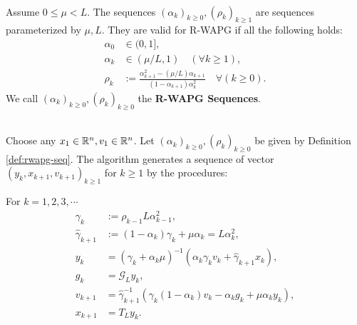 \documentclass[12pt]{article}
\begin{document}
        \begin{definition}\label{def:rwapg-seq}\;\\
            Assume $0 \le \mu < L$. 
            The sequences $(\alpha_k)_{k \ge 0}, (\rho_k)_{k \ge1}$ are sequences parameterized by $\mu, L$. 
            They are valid for R-WAPG if all the following holds: 
            \begin{align*}
                \alpha_0 &\in (0, 1], 
                \\
                \alpha_k &\in (\mu/L, 1) \quad (\forall k \ge 1), 
                \\
                \rho_k &:= \frac{\alpha_{k + 1}^2 - (\mu/L)\alpha_{k + 1}}{(1 - \alpha_{k + 1})\alpha_k^2} \quad \forall (k \ge 0). 
            \end{align*}
            We call $(\alpha_k)_{k \ge 0}, (\rho_k)_{k \ge 0}$ the \textbf{R-WAPG Sequences}. 
        \end{definition}
        \begin{definition}\label{def:wapg}\;\\
            Choose any $x_1 \in \mathbb R^n, v_1 \in \mathbb R^n$. 
            Let $(\alpha_k)_{k \ge0}, (\rho_k)_{k \ge 0}$ be given by Definition \ref{def:rwapg-seq}. 
            The algorithm generates a sequence of vector $(y_k, x_{k + 1}, v_{k + 1})_{k \ge 1}$ for $k\ge 1$ by the procedures:  
            \begin{tcolorbox}
                For $k=1, 2, 3, \cdots$
                \begin{align*}
                    \gamma_k &:= \rho_{k -1}L\alpha_{k - 1}^2, 
                    \\
                    \hat \gamma_{k + 1} & := (1 - \alpha_k)\gamma_k + \mu \alpha_k = L\alpha_k^2, 
                    \\
                    y_k &= 
                    (\gamma_k + \alpha_k \mu)^{-1}(\alpha_k \gamma_k v_k + \hat\gamma_{k + 1} x_k), 
                    \\
                    g_k &= \mathcal G_L y_k, 
                    \\
                    v_{k + 1} &= 
                    \hat\gamma^{-1}_{k + 1}
                    (\gamma_k(1 - \alpha_k) v_k - \alpha_k g_k + \mu \alpha_k y_k), 
                    \\
                    x_{k + 1} &= T_L y_k. 
                \end{align*}    
            \end{tcolorbox}
        \end{definition}
\end{document}
